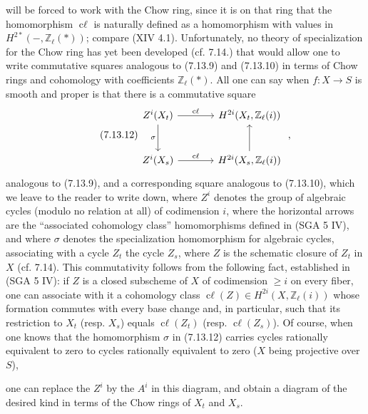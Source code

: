 %
will be forced to work with the Chow ring, since it is on that ring that the homomorphism \(\operatorname{c\ell}\) is naturally defined as a homomorphism with values in \(H^{2*}(-,\mathbb Z_\ell(*))\); compare (XIV 4.1). Unfortunately, no theory of specialization for the Chow ring has yet been developed (cf. 7.14.) that would allow one to write commutative squares analogous to (7.13.9) and (7.13.10) in terms of Chow rings and cohomology with coefficients \(\mathbb Z_\ell(*)\). All one can say when \(f:X\to S\) is smooth and proper is that there is a commutative square
\begin{equation}\tag{7.13.12}
\begin{tikzcd}[column sep=large,row sep=large]
Z^i(X_t) \arrow[r,"\operatorname{c\ell}"] \arrow[d,"\sigma"'] &
H^{2i}(X_t,\mathbb Z_\ell(i))\\
Z^i(X_s) \arrow[r,"\operatorname{c\ell}"] &
H^{2i}(X_s,\mathbb Z_\ell(i)) \arrow[u]
\end{tikzcd}
\;,
\end{equation}
analogous to (7.13.9), and a corresponding square analogous to (7.13.10), which we leave to the reader to write down, where \(Z^i\) denotes the group of algebraic cycles (modulo no relation at all) of codimension \(i\), where the horizontal arrows are the ``associated cohomology class'' homomorphisms defined in (SGA 5 IV), and where \(\sigma\) denotes the specialization homomorphism for algebraic cycles, associating with a cycle \(Z_t\) the cycle \(Z_s\), where \(Z\) is the schematic closure of \(Z_t\) in \(X\) (cf. 7.14). This commutativity follows from the following fact, established in (SGA 5 IV): if \(Z\) is a closed subscheme of \(X\) of codimension \(\geq i\) on every fiber, one can associate with it a cohomology class \(\operatorname{c\ell}(Z)\in H^{2i}(X,\mathbb Z_\ell(i))\) whose formation commutes with every base change and, in particular, such that its restriction to \(X_t\) (resp. \(X_s\)) equals \(\operatorname{c\ell}(Z_t)\) (resp. \(\operatorname{c\ell}(Z_s)\)). Of course, when one knows that the homomorphism \(\sigma\) in (7.13.12) carries cycles rationally equivalent to zero to cycles rationally equivalent to zero (\(X\) being projective over \(S\)),

%
one can replace the \(Z^i\) by the \(A^i\) in this diagram, and obtain a diagram of the desired kind in terms of the Chow rings of \(X_t\) and \(X_s\).


